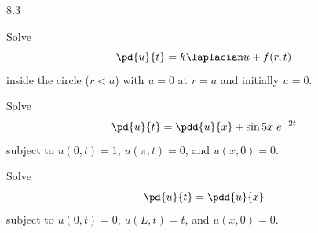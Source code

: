 \begin{exercises}{8.3}
\item[\starred 8.3.5.] Solve
\[
\pd{u}{t} = k\laplacian u + f(r,t)
\]
inside the circle ($r < a$) with $u=0$ at $r=a$ and initially $u=0$.

\item[8.3.6.] Solve
\[
\pd{u}{t} = \pdd{u}{x} + \sin 5x\;e^{-2t}
\]
subject to $u(0,t) = 1$, $u(\pi,t) = 0$, and $u(x,0) = 0$.

\item[\starred 8.3.7.] Solve
\[
\pd{u}{t} = \pdd{u}{x}
\]
subject to $u(0,t) = 0$, $u(L,t) = t$, and $u(x,0) = 0$.

\end{exercises}
